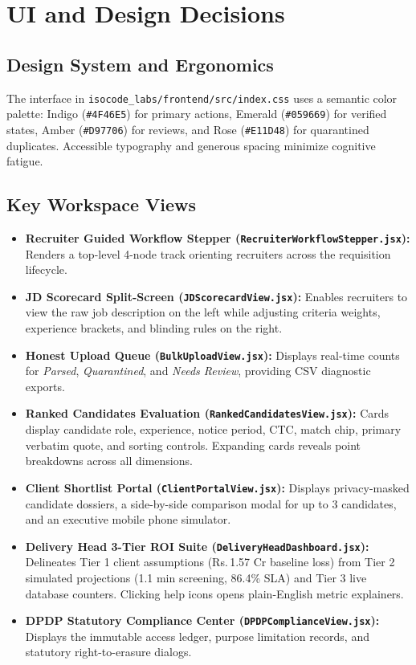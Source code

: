 \documentclass[11pt,a4paper,oneside]{report}
\newcommand{\INR}{\textsf{Rs.\,}}
\begin{document}
\chapter{UI and Design Decisions}

\section{Design System and Ergonomics}
The interface in \texttt{isocode\_labs/frontend/src/index.css} uses a semantic color palette: Indigo (\texttt{\#4F46E5}) for primary actions, Emerald (\texttt{\#059669}) for verified states, Amber (\texttt{\#D97706}) for reviews, and Rose (\texttt{\#E11D48}) for quarantined duplicates. Accessible typography and generous spacing minimize cognitive fatigue.

\section{Key Workspace Views}
\begin{itemize}[leftmargin=1.5em]
    \item \textbf{Recruiter Guided Workflow Stepper (\texttt{RecruiterWorkflowStepper.jsx}):} Renders a top-level 4-node track orienting recruiters across the requisition lifecycle.
    \item \textbf{JD Scorecard Split-Screen (\texttt{JDScorecardView.jsx}):} Enables recruiters to view the raw job description on the left while adjusting criteria weights, experience brackets, and blinding rules on the right.
    \item \textbf{Honest Upload Queue (\texttt{BulkUploadView.jsx}):} Displays real-time counts for \textit{Parsed}, \textit{Quarantined}, and \textit{Needs Review}, providing CSV diagnostic exports.
    \item \textbf{Ranked Candidates Evaluation (\texttt{RankedCandidatesView.jsx}):} Cards display candidate role, experience, notice period, CTC, match chip, primary verbatim quote, and sorting controls. Expanding cards reveals point breakdowns across all dimensions.
    \item \textbf{Client Shortlist Portal (\texttt{ClientPortalView.jsx}):} Displays privacy-masked candidate dossiers, a side-by-side comparison modal for up to 3 candidates, and an executive mobile phone simulator.
    \item \textbf{Delivery Head 3-Tier ROI Suite (\texttt{DeliveryHeadDashboard.jsx}):} Delineates Tier 1 client assumptions (\INR 1.57 Cr baseline loss) from Tier 2 simulated projections (1.1 min screening, 86.4\% SLA) and Tier 3 live database counters. Clicking help icons opens plain-English metric explainers.
    \item \textbf{DPDP Statutory Compliance Center (\texttt{DPDPComplianceView.jsx}):} Displays the immutable access ledger, purpose limitation records, and statutory right-to-erasure dialogs.
\end{itemize}
\end{document}

